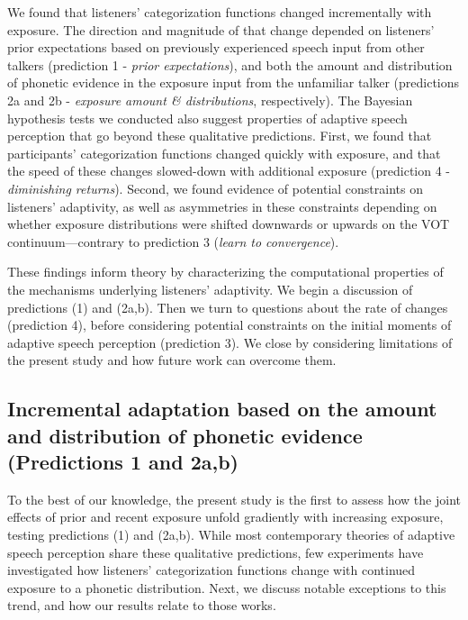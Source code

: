\documentclass[
  11pt,
  man,mask,floatsintext]{apa6}
\begin{document}
We found that listeners' categorization functions changed incrementally with exposure. The direction and magnitude of that change depended on listeners' prior expectations based on previously experienced speech input from other talkers (prediction 1 - \emph{prior expectations}), and both the amount and distribution of phonetic evidence in the exposure input from the unfamiliar talker (predictions 2a and 2b - \emph{exposure amount \& distributions}, respectively). The Bayesian hypothesis tests we conducted also suggest properties of adaptive speech perception that go beyond these qualitative predictions. First, we found that participants' categorization functions changed quickly with exposure, and that the speed of these changes slowed-down with additional exposure (prediction 4 - \emph{diminishing returns}). Second, we found evidence of potential constraints on listeners' adaptivity, as well as asymmetries in these constraints depending on whether exposure distributions were shifted downwards or upwards on the VOT continuum---contrary to prediction 3 (\emph{learn to convergence}).

These findings inform theory by characterizing the computational properties of the mechanisms underlying listeners' adaptivity. We begin a discussion of predictions (1) and (2a,b). Then we turn to questions about the rate of changes (prediction 4), before considering potential constraints on the initial moments of adaptive speech perception (prediction 3). We close by considering limitations of the present study and how future work can overcome them.

\subsection{Incremental adaptation based on the amount and distribution of phonetic evidence (Predictions 1 and 2a,b)}\label{incremental-adaptation-based-on-the-amount-and-distribution-of-phonetic-evidence-predictions-1-and-2ab}

To the best of our knowledge, the present study is the first to assess how the joint effects of prior and recent exposure unfold gradiently with increasing exposure, testing predictions (1) and (2a,b). While most contemporary theories of adaptive speech perception share these qualitative predictions, few experiments have investigated how listeners' categorization functions change with continued exposure to a phonetic distribution. Next, we discuss notable exceptions to this trend, and how our results relate to those works.
\end{document}

